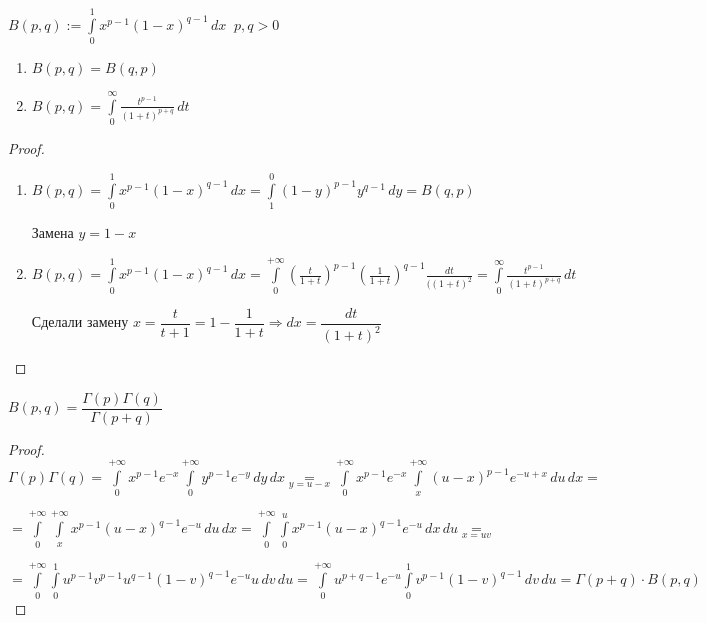 
\begin{definition}\thmslashn
	
	$B(p, q) := \int\limits_{0}^{1} x^{p-1}(1-x)^{q-1}\,dx \;\; p, q > 0$
	
\end{definition}

\begin{properties}[$B$-функции]\thmslashn
	
	\begin{enumerate}
		\item 
		$B(p, q) = B(q, p)$
		\item 
		$B(p, q) = \int\limits_{0}^{\infty}\frac{t^{p-1}}{(1+t)^{p+q}}\,dt$
	\end{enumerate}
	
\end{properties}

\begin{proof}\thmslashn

	\begin{enumerate}
		\item 
		$B(p, q) = \int\limits_{0}^{1} x^{p-1}(1-x)^{q-1}\,dx = \int\limits_{1}^{0} (1-y)^{p-1}y^{q-1}\,dy = B(q, p)$
		
		Замена $y = 1-x$
		
		\item 
		$B(p, q) = \int\limits_{0}^{1} x^{p-1}(1-x)^{q-1}\,dx =\int\limits_{0}^{+\infty} \left(\frac{t}{1+t}\right)^{p-1}\left(\frac{1}{1+t}\right)^{q-1}\frac{dt}{((1+t)^2} = \int\limits_{0}^{\infty} \frac{t^{p-1}}{(1+t)^{p+q}}\,dt$
		
		Сделали замену $x = \dfrac{t}{t+1} = 1- \dfrac{1}{1+t} \Rightarrow dx = \dfrac{dt}{(1+t)^2}$
	\end{enumerate}

\end{proof}

\begin{theorem}
	$B(p, q) = \dfrac{\Gamma(p) \Gamma(q)}{\Gamma(p+q)}$
\end{theorem}


\begin{proof}\thmslashn
	
	$\Gamma(p)\Gamma(q) = \int\limits_{0}^{+\infty} x^{p-1} e^{-x} \int\limits_{0}^{+\infty} y^{p-1} e^{-y} \,dy\,dx \underset{y = u-x}= \int\limits_{0}^{+\infty} x^{p-1} e^{-x} \int\limits_{x}^{+\infty} (u-x)^{p-1} e^{-u+x} \,du\,dx = $
	
	
	$=\int\limits_{0}^{+\infty} \int\limits_{x}^{+\infty} x^{p-1}(u-x)^{q-1} e^{-u} \,du\,dx = \int\limits_{0}^{+\infty} \int\limits_{0}^{u} x^{p-1}(u-x)^{q-1} e^{-u} \,dx\,du \underset{x = uv}=$
	

	$=\int\limits_{0}^{+\infty} \int\limits_{0}^{1} u^{p-1}v^{p-1}u^{q-1} (1-v)^{q-1} e^{-u} u \,dv\,du = \int\limits_{0}^{+\infty} u^{p+q-1} e^{-u} \int\limits_{0}^{1} v^{p-1}(1-v)^{q-1} \,dv\,du = \Gamma(p+q)\cdot B(p, q)$
	
\end{proof}

